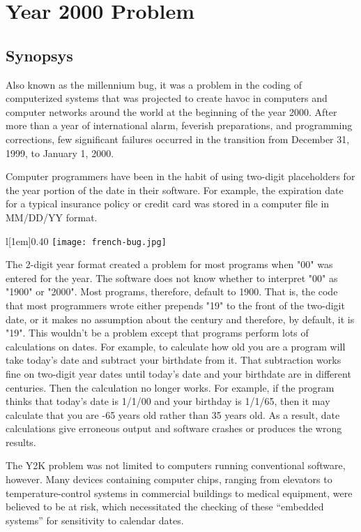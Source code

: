 \documentclass[compilation.tex]{subfiles}
\begin{document}
	
\section{Year 2000 Problem}

\subsection{Synopsys}

Also known as the millennium bug, it was a problem in the coding of computerized systems that was projected to create havoc in computers and computer networks around the world at the beginning of the year 2000. After more than a year of international alarm, feverish preparations, and programming corrections, few significant failures occurred in the transition from December 31, 1999, to January 1, 2000.

Computer programmers have been in the habit of using two-digit placeholders for the year portion of the date in their software. For example, the expiration date for a typical insurance policy or credit card was stored in a computer file in MM/DD/YY format.

\begin{wrapfigure}[10]{l}[1em]{0.40\textwidth}
	\vspace{-0.5\baselineskip}
	\texttt{[image: french-bug.jpg]}
\end{wrapfigure}

The 2-digit year format created a problem for most programs when "00" was entered for the year. The software does not know whether to interpret "00" as "1900" or "2000". Most programs, therefore, default to 1900. That is, the code that most programmers wrote either prepends "19" to the front of the two-digit date, or it makes no assumption about the century and therefore, by default, it is "19". This wouldn't be a problem except that programs perform lots of calculations on dates. For example, to calculate how old you are a program will take today's date and subtract your birthdate from it. That subtraction works fine on two-digit year dates until today's date and your birthdate are in different centuries. Then the calculation no longer works. For example, if the program thinks that today's date is 1/1/00 and your birthday is 1/1/65, then it may calculate that you are -65 years old rather than 35 years old. As a result, date calculations give erroneous output and software crashes or produces the wrong results.

The Y2K problem was not limited to computers running conventional software, however. Many devices containing computer chips, ranging from elevators to temperature-control systems in commercial buildings to medical equipment, were believed to be at risk, which necessitated the checking of these “embedded systems” for sensitivity to calendar dates.
\end{document}
